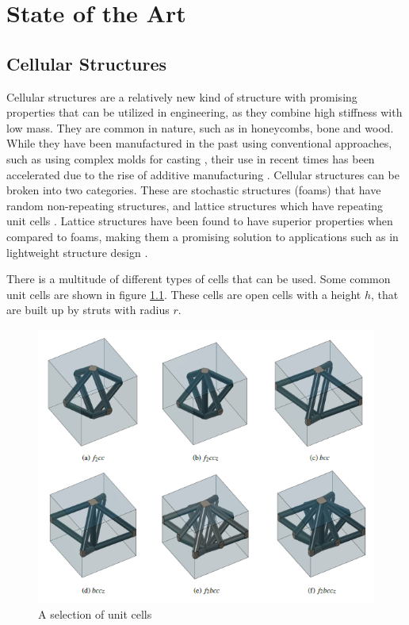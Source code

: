 \chapter{State of the Art}
\label{chap:state_of_the_art}

\section{Cellular Structures}
\label{chap:cellular_structures}
Cellular structures are a relatively new kind of structure with promising properties that can be utilized in engineering, as they combine high stiffness with low mass. They are common in nature, such as in honeycombs, bone and wood. While they have been manufactured in the past using conventional approaches, such as using complex molds for casting \cite{Tao_Leu_2016}, their use in recent times has been accelerated due to the rise of additive manufacturing \cite{Jandyal_Chaturvedi_Wazir_Raina_Ul_Haq_2022}. Cellular structures can be broken into two categories. These are stochastic structures (foams) that have random non-repeating structures, and lattice structures which have repeating unit cells \cite{Tao_Leu_2016}. Lattice structures have been found to have superior properties when compared to foams, making them a promising solution to applications such as in lightweight structure design \cite{Tao_Leu_2016}. 

There is a multitude of different types of cells that can be used. Some common unit cells are shown in figure \ref{fig:unit_cells}. These cells are open cells with a height $h$, that are built up by struts with radius $r$.
\begin{figure}[ht]
    \centering
    \includegraphics[width=0.7\linewidth]{figures/chapter_3/UnitCells.png}
    \caption{A selection of unit cells \cite{Piacquadio_Soika_Schirp_Schröder_Filippeschi_2023}}
    \label{fig:unit_cells}
\end{figure}

